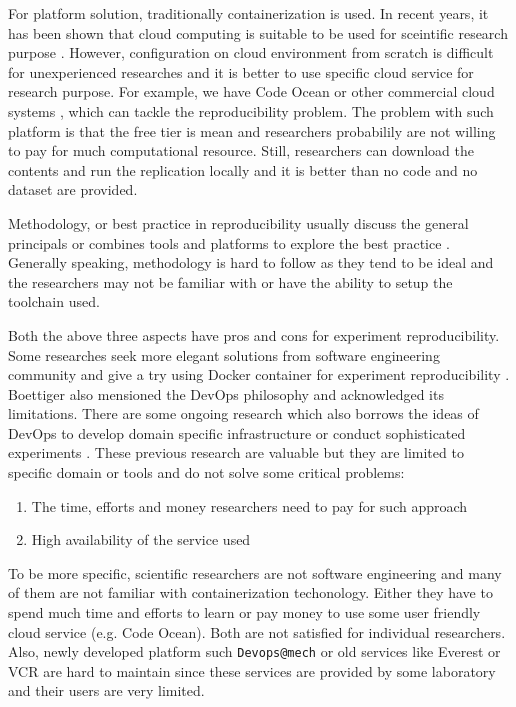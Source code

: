 \documentclass{IEEEcsmag}
\begin{document}
For platform solution, traditionally containerization is used. In recent years, it has been shown that cloud computing is suitable to be used for sceintific research purpose \cite{Howe12}. However, configuration on cloud environment from scratch is difficult for unexperienced researches and it is better to use specific cloud service for research purpose. For example, we have Code Ocean or other commercial cloud systems \cite{perkel2018data}, which can tackle the reproducibility problem. The problem with such platform is that the free tier is mean and researchers probabilily are not willing to pay for much computational resource. Still, researchers can download the contents and run the replication locally and it is better than no code and no dataset are provided.

Methodology, or best practice in reproducibility usually discuss the general principals \cite{stodden2014best} or combines tools and platforms to explore the best practice \cite{QashaCW16}. Generally speaking, methodology is hard to follow as they tend to be ideal and the researchers may not be familiar with or have the ability to setup the toolchain used.  

Both the above three aspects have pros and cons for experiment reproducibility. Some researches seek more elegant solutions from software engineering community and give a try using Docker container for experiment reproducibility \cite{Boettiger15}.
Boettiger also mensioned the DevOps philosophy and acknowledged its limitations.
There are some ongoing research which also borrows the ideas of DevOps to develop domain specific infrastructure \cite{philips2019devops} or conduct sophisticated experiments \cite{chwalisz2019walker}. These previous research are valuable but they are limited to specific domain or tools and do not solve some critical problems:
\begin{enumerate}
\item The time, efforts and money researchers need to pay for such approach
\item High availability of the service used
\end{enumerate}

To be more specific, scientific researchers are not software engineering and many of them are not familiar with containerization techonology. Either they have to spend much time and efforts to learn or pay money to use some user friendly 
cloud service (e.g. Code Ocean). Both are not satisfied for individual researchers. Also, newly developed platform such \texttt{Devops@mech} \cite{philips2019devops} or old services like Everest \cite{VOLKOV2017112} or VCR \cite{GavishD12} are hard to maintain since these services are provided by some laboratory and their users are very limited.
\end{document}
